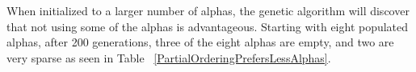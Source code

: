 \documentclass[3p,times,procedia]{elsarticle}
\begin{document}
When initialized to a larger number of alphas, the genetic algorithm will discover that not using some of the alphas is advantageous. Starting with eight populated alphas, after 200 generations, three of the eight alphas are empty, and two are very sparse as seen in Table ~\ref{PartialOrderingPrefersLessAlphas}.

\end{document}

